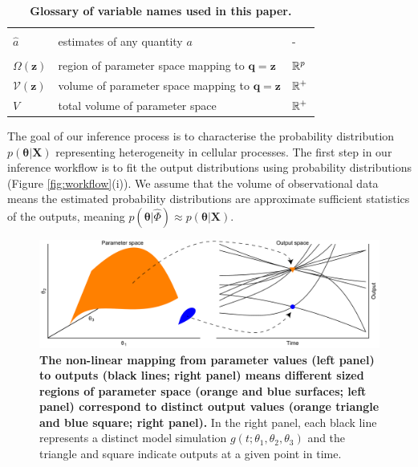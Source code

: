 \begin{table}[htbp]
\begin{adjustwidth}{-0.5in}{-0.5in}
\begin{tabularx}{1.1\textwidth}{lll}
&&\\
$\hat{a}$ & estimates of any quantity $a$                                                                             & - \\
&&\\
$\Omega(\boldsymbol{z})$              & region of parameter space mapping to $\boldsymbol{q}=\boldsymbol{z}$          & $\mathbb{R}^p$ \\
$\mathcal{V}(\boldsymbol{z})$         & volume of parameter space mapping to $\boldsymbol{q}=\boldsymbol{z}$          & $\mathbb{R}^+$ \\
$V$                                   & total volume of parameter space                                               & $\mathbb{R}^+$ \\
\end{tabularx}
\caption{\textbf{Glossary of variable names used in this paper.}} %
\label{tab:variable_glossary}
\end{adjustwidth}
\end{table}


The goal of our inference process is to  characterise the probability distribution $p(\boldsymbol{\theta}|\boldsymbol{X})$ representing heterogeneity in cellular processes. The first step in our inference workflow is to fit the output distributions using probability distributions (Figure \ref{fig:workflow}(i)). We assume that the volume of observational data means the estimated probability distributions are approximate sufficient statistics of the outputs, meaning $p(\boldsymbol{\theta}|\hat{\Phi}) \approx p(\boldsymbol{\theta}|\boldsymbol{X})$.

\begin{figure}[H]
	\centerline{\includegraphics[width=\textwidth]{../figures/contour_volumes.pdf}}
	\caption{\textbf{The non-linear mapping from parameter values (left panel) to outputs (black lines; right panel) means different sized regions of parameter space (orange and blue surfaces; left panel) correspond to distinct output values (orange triangle and blue square; right panel).} In the right panel, each black line represents a distinct model simulation $g(t; \theta_1, \theta_2, \theta_3)$ and the triangle and square indicate outputs at a given point in time.}
	\label{fig:contour_volumes}
\end{figure}

